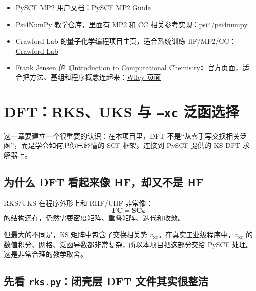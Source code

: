 \documentclass[UTF8,11pt,fontset=fandol]{ctexbook}
\begin{document}
\begin{resourcebox}[继续学习资料]
\begin{itemize}
  \item PySCF MP2 用户文档：\href{https://pyscf.org/user/mp.html}{PySCF MP2 Guide}
  \item Psi4NumPy 教学仓库，里面有 MP2 和 CC 相关参考实现：\href{https://github.com/psi4/psi4numpy}{psi4/psi4numpy}
  \item Crawford Lab 的量子化学编程项目主页，适合系统训练 HF/MP2/CC：\href{https://crawford.chem.vt.edu/}{Crawford Lab}
  \item Frank Jensen 的《Introduction to Computational Chemistry》官方页面，适合把方法、基组和程序概念连起来：\href{https://www.wiley-vch.de/en/areas-interest/natural-sciences/introduction-to-computational-chemistry-978-1-118-82599-0}{Wiley 页面}
\end{itemize}
\end{resourcebox}

\chapter{DFT：RKS、UKS 与 \texttt{--xc} 泛函选择}

\begin{goalbox}[本章目标]
这一章要建立一个很重要的认识：在本项目里，DFT 不是“从零手写交换相关泛函”，而是学会如何把你已经懂的 SCF 框架，连接到 PySCF 提供的 KS-DFT 求解器上。
\end{goalbox}

\section{为什么 DFT 看起来像 HF，却又不是 HF}

RKS/UKS 在程序外形上和 RHF/UHF 非常像：
\begin{equation}
\mathbf{F}\mathbf{C} = \mathbf{S}\mathbf{C}\bm{\varepsilon}
\end{equation}
的结构还在，仍然需要密度矩阵、重叠矩阵、迭代和收敛。

但最大的不同是，KS 矩阵中包含了交换相关势 \(v_{\mathrm{xc}}\)。在真实工业级程序中，\(v_{\mathrm{xc}}\) 的数值积分、网格、泛函导数都非常复杂，所以本项目把这部分交给 PySCF 处理。这是非常合理的教学取舍。

\section{先看 \texttt{rks.py}：闭壳层 DFT 文件其实很整洁}
\end{document}
